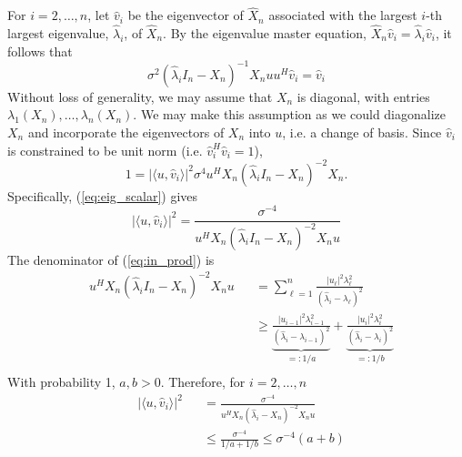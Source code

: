 For $i=2,\dots,n$, let $\widehat{v}_i$ be the eigenvector of $\widehat{X}_n$ associated with the largest $i$-th largest eigenvalue, $\widehat{\lambda}_i$, of $\widehat{X}_n$.  By the eigenvalue master equation, $\widehat{X}_n\widehat{v}_i=\widehat{\lambda}_i\widehat{v}_i$, it follows that
\begin{equation}\label{eq:eig_master}
  \sigma^2\left(\widehat{\lambda}_iI_n-X_n\right)^{-1}X_nuu^H\widehat{v}_i=\widehat{v}_i
\end{equation}
Without loss of generality, we may assume that $X_n$ is diagonal, with entries $\lambda_1\left(X_n\right),\dots,\lambda_n\left(X_n\right)$. We may make this assumption as we could diagonalize $X_n$ and incorporate the eigenvectors of $X_n$ into $u$, i.e. a change of basis. Since $\widehat{v}_i$ is constrained to be unit norm (i.e. $\widehat{v}_i^H\widehat{v}_i = 1$),
\begin{equation}\label{eq:eig_scalar}
  1 = |\langle u,\widehat{v}_i\rangle|^2\sigma^4u^HX_n\left(\widehat{\lambda}_iI_n-X_n\right)^{-2}X_n.
\end{equation}
Specifically, (\ref{eq:eig_scalar}) gives
\begin{equation}\label{eq:in_prod}
  |\langle u,\widehat{v}_i\rangle|^2 = \frac{\sigma^{-4}}{u^HX_n\left(\widehat{\lambda}_iI_n-X_n\right)^{-2}X_nu}
\end{equation}
The denominator of (\ref{eq:in_prod}) is 
\begin{equation}
\begin{aligned}
&u^HX_n\left(\widehat{\lambda}_iI_n-X_n\right)^{-2}X_nu &&= \sum_{\ell=1}^n\frac{|u_\ell|^2\lambda_\ell^2}{\left(\widehat{\lambda}_i-\lambda_\ell\right)^2}\\
&&&\geq \underbrace{\frac{|u_{i-1}|^2\lambda_{i-1}^2}{\left(\widehat{\lambda}_i-\lambda_{i-1}\right)^2}}_{=:1/a} + \underbrace{\frac{|u_{i}|^2\lambda_{i}^2}{\left(\widehat{\lambda}_i-\lambda_{i}\right)^2}}_{=:1/b}\\
\end{aligned}
\end{equation}
With probability 1, $a,b>0$. Therefore, for $i=2,\dots,n$
\begin{equation*}
  \begin{aligned}
    &|\langle u,\widehat{v}_i\rangle|^2 &&= \frac{\sigma^{-4}}{u^HX_n\left(\widehat{\lambda}_i-X_n\right)^{-2}X_nu}\\
    &&&\leq \frac{\sigma^{-4}}{1/a+1/b}\leq \sigma^{-4}(a+b)
  \end{aligned}
\end{equation*}
